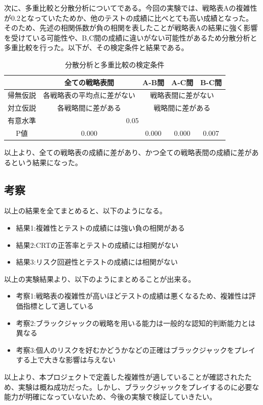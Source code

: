 次に、多重比較と分散分析についてである。今回の実験では、戦略表Aの複雑性が0.2となっていたためか、他のテストの成績に比べとても高い成績となった。そのため、先述の相関係数が負の相関を表したことが戦略表Aの結果に強く影響を受けている可能性や、B,C間の成績に違いがない可能性があるため分散分析と多重比較を行った。以下が、その検定条件と結果である。
\begin{table}[H]
    \begin{center}
        \caption{分散分析と多重比較の検定条件}
        \begin{tabular}{|c|c|c|c|c|}
        \hline
            & 全ての戦略表間       & A-B間     & A-C間     & B-C間     \\ \hline
        帰無仮説 & 各戦略表の平均点に差がない & \multicolumn{3}{c|}{戦略表間に差がない} \\ \hline
        対立仮説 & 各戦略間に差がある     & \multicolumn{3}{c|}{戦略間に差がある}  \\ \hline
        有意水準 & \multicolumn{4}{c|}{0.05}                      \\ \hline
        P値   & 0.000         & 0.000    & 0.000    & 0.007    \\ \hline
        \end{tabular}
    \end{center}
\end{table}
以上より、全ての戦略表の成績に差があり、かつ全ての戦略表間の成績に差があるという結果になった。

\subsection{考察}

以上の結果を全てまとめると、以下のようになる。
\begin{itemize}
    \item 結果1:複雑性とテストの成績には強い負の相関がある
    \item 結果2:CRTの正答率とテストの成績には相関がない
    \item 結果3:リスク回避性とテストの成績には相関がない
\end{itemize}
以上の実験結果より、以下のようにまとめることが出来る。
\begin{itemize}
    \item 考察1:戦略表の複雑性が高いほどテストの成績は悪くなるため、複雑性は評価指標として適している
    \item 考察2:ブラックジャックの戦略を用いる能力は一般的な認知的判断能力とは異なる
    \item 考察3:個人のリスクを好むかどうかなどの正確はブラックジャックをプレイする上で大きな影響は与えない
\end{itemize}
以上より、本プロジェクトで定義した複雑性が適していることが確認されたため、実験は概ね成功だった。しかし、ブラックジャックをプレイするのに必要な能力が明確になっていないため、今後の実験で検証していきたい。

